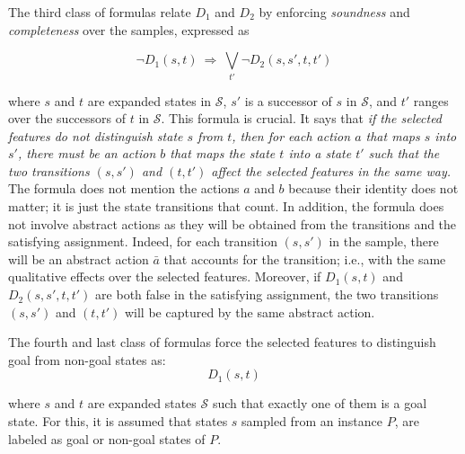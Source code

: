 \documentclass[letterpaper]{article} %
\newcommand{\Omit}[1]{}
\renewcommand{\S}{\mathcal{S}}
\begin{document}
The third class of formulas relate $D_1$ and $D_2$ by enforcing \emph{soundness}
and \emph{completeness} over  the samples, expressed as
\Omit{
Since the abstract actions  are not given,
the qualitative changes in each  transition $(s,s')$ in $\S$
are  taken as templates  of abstract actions. Thus, if $s$ and $t$ are not distinguished by the selected features, 
for each transition $(s, s') \in \S$, there must be a transition $(t, t') \in \S$
such that the two transitions are not distinguished by the selected features either.
This is expressed as
}
%
\begin{equation}
  \label{eq:bridge1}
  \neg D_1(s, t) \  \Rightarrow\ \textstyle\bigvee_{t'} \neg D_2(s, s', t, t')
\end{equation}

\noindent where $s$ and $t$ are expanded states in  $\S$, $s'$ is a successor of $s$ in $\S$,
and $t'$ ranges over the successors of $t$ in $\S$. This formula is crucial. 
It says that \emph{if the selected features do not distinguish state $s$ from $t$,
then for each action $a$ that maps  $s$ into $s'$, there must be an action $b$ that maps the state
$t$ into a state $t'$ such that the two transitions $(s,s')$ and $(t,t')$ affect the selected features
in the same way.} The formula does not mention the actions $a$ and $b$ because their identity does not matter;
it is just the state transitions that count. In addition, the formula does not involve abstract actions as they
will be obtained from the transitions and  the satisfying assignment. Indeed, for each transition $(s,s')$ in the sample, there will be
an abstract action $\bar{a}$ that  accounts for the transition; i.e., with the  same qualitative effects over the selected features.
Moreover, if $D_1(s,t)$ and $D_2(s,s',t,t')$ are both false in the satisfying assignment, the two transitions $(s,s')$ and $(t,t')$
will be captured by the same abstract action.


The fourth and  last class of formulas force the selected features to distinguish goal from non-goal states as:
\begin{equation}
  \label{eq:goal}
  D_1(s,t) 
\end{equation}

\noindent where  $s$ and $t$  are expanded states  $\S$ such that exactly one of them is a goal state. 
For this, it is assumed that  states $s$ sampled from an instance $P$, are labeled as goal or non-goal states
of $P$.
\end{document}
